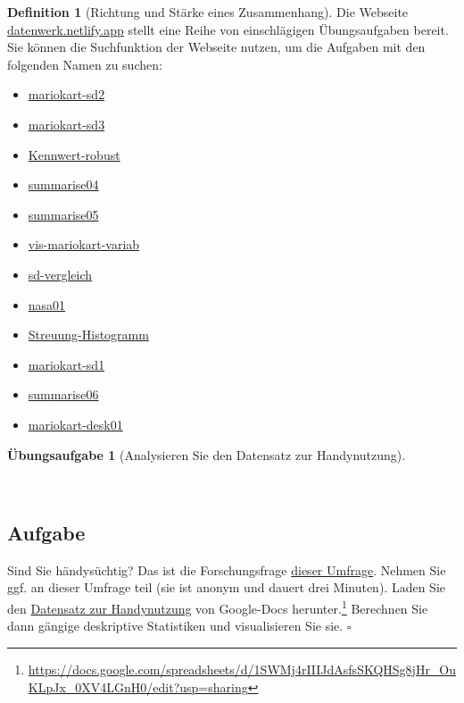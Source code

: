 \documentclass[
  a4paper,
  DIV=11]{scrreprt}
\providecommand{\tightlist}{%
  \setlength{\itemsep}{0pt}\setlength{\parskip}{0pt}}\usepackage{longtable,booktabs,array}
\theoremstyle{definition}
\newtheorem{exercise}{Übungsaufgabe}[chapter]
\theoremstyle{definition}
\theoremstyle{definition}
\newtheorem{definition}{Definition}[chapter]
\theoremstyle{remark}
\begin{document}
\begin{definition}[Richtung und Stärke eines
Zusammenhang]
Die Webseite \href{https://datenwerk.netlify.app}{datenwerk.netlify.app}
stellt eine Reihe von einschlägigen Übungsaufgaben bereit. Sie können
die Suchfunktion der Webseite nutzen, um die Aufgaben mit den folgenden
Namen zu suchen:

\begin{itemize}
\tightlist
\item
  \href{https://datenwerk.netlify.app/posts/mariokart-sd2/mariokart-sd2}{mariokart-sd2}
\item
  \href{https://datenwerk.netlify.app/posts/mariokart-sd3/mariokart-sd3}{mariokart-sd3}
\item
  \href{https://datenwerk.netlify.app/posts/kennwert-robust/kennwert-robust}{Kennwert-robust}
\item
  \href{https://datenwerk.netlify.app/posts/summarise04/summarise04}{summarise04}
\item
  \href{https://datenwerk.netlify.app/posts/summarise05/summarise05}{summarise05}
\item
  \href{https://datenwerk.netlify.app/posts/vis-mariokart-variab/vis-mariokart-variab}{vis-mariokart-variab}
\item
  \href{https://datenwerk.netlify.app/posts/sd-vergleich/sd-vergleich}{sd-vergleich}
\item
  \href{https://datenwerk.netlify.app/posts/nasa01/nasa01}{nasa01}
\item
  \href{https://datenwerk.netlify.app/posts/streuung-histogramm/streuung-histogramm}{Streuung-Histogramm}
\item
  \href{https://datenwerk.netlify.app/posts/mariokart-sd1/mariokart-sd1}{mariokart-sd1}
\item
  \href{https://datenwerk.netlify.app/posts/summarise06/summarise06}{summarise06}
\item
  \href{https://datenwerk.netlify.app/posts/mariokart-desk01/mariokart-desk01}{mariokart-desk01}
\end{itemize}

\begin{exercise}[Analysieren Sie den Datensatz zur
Handynutzung]\protect\hypertarget{exr-handy}{}\label{exr-handy}

~

\subsection{Aufgabe}

Sind Sie händysüchtig? Das ist die Forschungsfrage
\href{https://docs.google.com/forms/d/e/1FAIpQLSfM6oDLHX4_lqWq-bXw39drTkdGAvecE6ow2HIKoxdrVygp2A/viewform}{dieser
Umfrage}. Nehmen Sie ggf. an dieser Umfrage teil (sie ist anonym und
dauert drei Minuten). Laden Sie den
\href{https://docs.google.com/spreadsheets/d/1SWMj4rIIIJdAsfsSKQHSg8jHr_OuKLpJx_0XV4LGnH0/edit?usp=sharing}{Datensatz
zur Handynutzung} von Google-Docs herunter.\footnote{\url{https://docs.google.com/spreadsheets/d/1SWMj4rIIIJdAsfsSKQHSg8jHr_OuKLpJx_0XV4LGnH0/edit?usp=sharing}}
Berechnen Sie dann gängige deskriptive Statistiken und visualisieren Sie
sie. \(\square\)


\end{exercise}
\end{definition}
\end{document}
